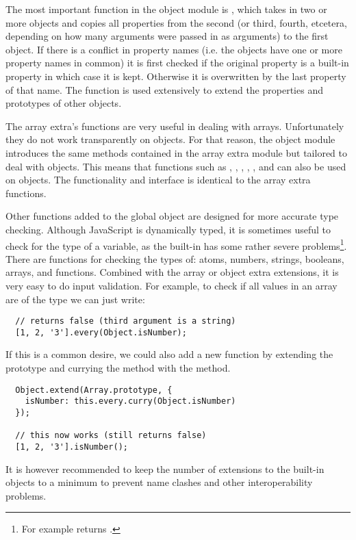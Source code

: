 The most important function in the object module is , which takes in two or more objects and copies all properties from the second (or third, fourth, etcetera, depending on how many arguments were passed in as arguments) to the first object. If there is a conflict in property names (i.e. the objects have one or more property names in common) it is first checked if the original property is a built-in property in which case it is kept. Otherwise it is overwritten by the last property of that name. The  function is used extensively to extend the properties and prototypes of other objects.

The array extra's functions are very useful in dealing with arrays. Unfortunately they do not work transparently on objects. For that reason, the object module introduces the same methods contained in the array extra module but tailored to deal with objects. This means that functions such as , , , , , and  can also be used on objects. The functionality and interface is identical to the array extra functions.

Other functions added to the global  object are designed for more accurate type checking. Although JavaScript is dynamically typed, it is sometimes useful to check for the type of a variable, as the built-in  has some rather severe problems\footnote{For example  returns .}. There are functions for checking the types of: atoms, numbers, strings, booleans, arrays, and functions. Combined with the array or object extra extensions, it is very easy to do input validation. For example, to check if all values in an array are of the type  we can just write:
\begin{verbatim}
  // returns false (third argument is a string)
  [1, 2, '3'].every(Object.isNumber);
\end{verbatim}
If this is a common desire, we could also add a new function by extending the  prototype and currying the  method with the  method.
\begin{verbatim}
  Object.extend(Array.prototype, {
    isNumber: this.every.curry(Object.isNumber)
  });

  // this now works (still returns false)
  [1, 2, '3'].isNumber();
\end{verbatim}
It is however recommended to keep the number of extensions to the built-in objects to a minimum to prevent name clashes and other interoperability problems.

